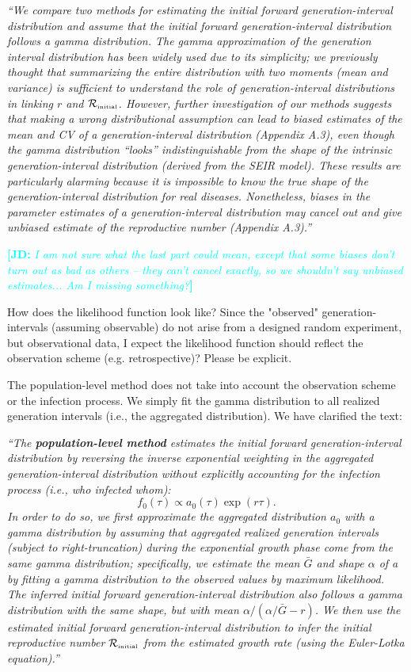 \documentclass[12pt]{article}
\newcommand{\Rx}[1]{\ensuremath{{\cal R}_{#1}}}
\newcommand{\Rini}{\Rx{\textrm{\tiny initial}}}
\newcommand{\revtext}{\textsf}
\newcommand{\newtext}[1]{\textsl{``#1''}}
\newcommand{\comment}[3]{\textcolor{#1}{\textbf{[#2: }\textsl{#3}\textbf{]}}}
\newcommand{\jd}[1]{\comment{cyan}{JD}{#1}}
\begin{document}
\newtext{We compare two methods for estimating the initial forward generation-interval distribution and assume that the initial forward generation-interval distribution follows a gamma distribution.
The gamma approximation of the generation interval distribution has been widely used due to its simplicity;
we previously thought that summarizing the entire distribution with two moments (mean and variance) is sufficient to understand the role of generation-interval distributions in linking $r$ and $\Rini$.
However, further investigation of our methods suggests that making a wrong distributional assumption can lead to biased estimates of the mean and CV of a generation-interval distribution (Appendix A.3), even though the gamma distribution ``looks'' indistinguishable from the shape of the intrinsic generation-interval distribution (derived from the SEIR model).
These results are particularly alarming because it is impossible to know the true shape of the generation-interval distribution for real diseases.
Nonetheless, biases in the parameter estimates of a generation-interval distribution may cancel out and give unbiased estimate of the reproductive number (Appendix A.3).}

\jd{I am not sure what the last part could mean, except that some biases don't turn out as bad as others -- they can't cancel exactly, so we shouldn't say unbiased estimates... Am I missing something?}

\revtext{How does the likelihood
function look like? Since the "observed" generation-intervals (assuming
observable) do not arise from a designed random experiment, but observational data, I expect the likelihood function should reflect the observation
scheme (e.g. retrospective)? Please be explicit.
}

The population-level method does not take into account the observation scheme or the infection process. 
We simply fit the gamma distribution to all realized generation intervals (i.e., the aggregated distribution).
We have clarified the text: 

\newtext{The \textbf{population-level method} estimates the initial forward generation-interval distribution by reversing the inverse exponential weighting in the aggregated generation-interval distribution without explicitly accounting for the infection process (i.e., who infected whom):
\begin{equation}
f_0(\tau) \propto a_0(\tau) \exp(r\tau).
\end{equation}
In order to do so, we first approximate the aggregated distribution $a_0$ with a gamma distribution by assuming that aggregated realized generation intervals (subject to right-truncation) during the exponential growth phase come from the same gamma distribution;
specifically, we estimate the mean $\bar G$ and shape $\alpha$ of a by fitting a gamma distribution to the observed values by maximum likelihood.
The inferred initial forward generation-interval distribution also follows a gamma distribution with the same shape, but with mean $\alpha/(\alpha/\bar G - r)$.
We then use the estimated initial forward generation-interval distribution to infer the initial reproductive number $\Rini$ from the estimated growth rate (using the Euler-Lotka equation).}
\end{document}
